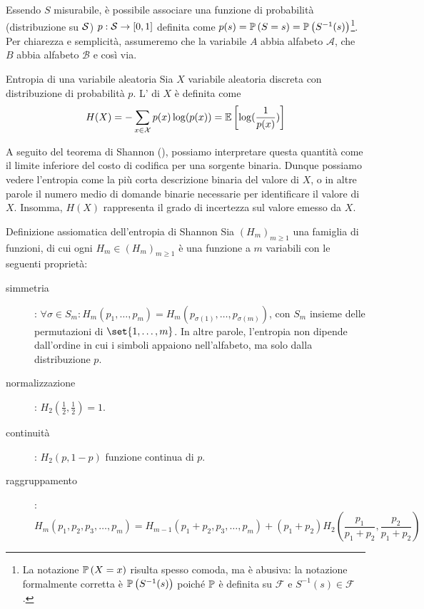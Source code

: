 Essendo \(S\) misurabile, è possibile associare una funzione  di probabilità (distribuzione su \(\mathcal{S}\)) \(p: \mathcal{S} \to [0,1]\) definita come \(p(s) = \Prob[S=s] = \Prob[S^{-1}(s)]\)\footnote{La notazione $\Prob[X=x]$ risulta spesso comoda, ma è abusiva: la notazione formalmente corretta è $\Prob[S^{-1}(s)]$ poiché $\Prob$ è definita su $\mathcal{F}$ e $S^{-1}(s) \in \mathcal{F}$.}.
Per chiarezza e semplicità, assumeremo che la variabile $A$ abbia alfabeto $\mathcal{A}$, che $B$ abbia alfabeto $\mathcal{B}$ e così via.

\begin{definition}{Entropia di una variabile aleatoria}
  Sia \(X\) variabile aleatoria discreta con distribuzione di probabilità \(p\).
  L' di \(X\) è definita come
  \[H(X) = -\sum_{x \in \mathcal{X}} p(x) \log( p(x))= \EV{\log(\frac{1}{p(x)})}\]
\end{definition}

A seguito del teorema di Shannon (), possiamo interpretare questa quantità come il limite inferiore del costo di codifica per una sorgente binaria.
Dunque possiamo vedere l'entropia come la più corta descrizione binaria del valore di \(X\), o in altre parole il numero medio di domande binarie necessarie per identificare il valore di \(X\). Insomma, $H(X)$ rappresenta il grado di incertezza sul valore emesso da $X$.

\begin{definition}{Definizione assiomatica dell'entropia di Shannon}
  Sia \({(H_m)}_{m \geq 1}\) una famiglia di funzioni, di cui ogni \(H_m \in {(H_m)}_{m \geq 1}\) è una funzione a \(m\) variabili con le seguenti proprietà:
  \begin{description}
    \item[simmetria]: \(\forall \sigma \in S_m: H_m(p_1,\ldots,p_m) = H_m(p_{\sigma(1)},\ldots,p_{\sigma(m)})\), con \( S_m\) insieme delle permutazioni di \(\set{1,\ldots,m}\). In altre parole, l'entropia non dipende dall'ordine in cui i simboli appaiono nell'alfabeto, ma solo dalla distribuzione $p$.
    \item[normalizzazione]: \(H_2\left(\frac{1}{2}, \frac{1}{2}\right) = 1\).
    \item[continuità]: \(H_2(p,1-p)\) funzione continua di \(p\).
    \item[raggruppamento]:
    \[H_m(p_1,p_2,p_3,\ldots,p_m) = H_{m-1}(p_1 + p_2,p_3,\ldots,p_m)+(p_1+p_2)H_2\left(\frac{p_1}{p_1+p_2},\frac{p_2}{p_1+p_2}\right)\]
  \end{description}
\end{definition}

